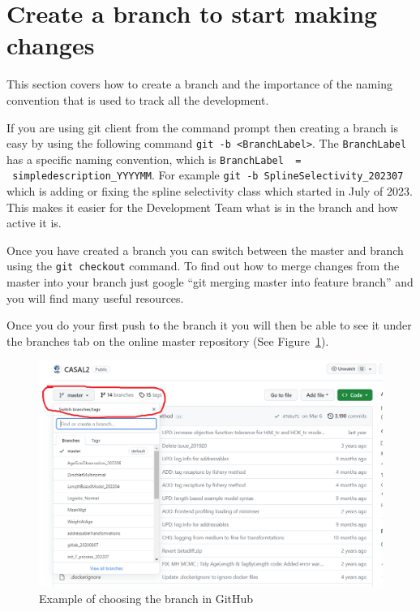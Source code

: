 \section{Create a branch to start making changes\label{sec:maintain_repo}}

This section covers how to create a branch and the importance of the naming convention that is used to track all the development. 

If you are using git client from the command prompt then creating a branch is easy by using the following command \texttt{git -b <BranchLabel>}. The \texttt{BranchLabel} has a specific naming convention, which is  \texttt{BranchLabel \ = \ simpledescription\_YYYYMM}. For example \texttt{git -b SplineSelectivity\_202307} which is adding or fixing the spline selectivity class which started in July of 2023. This makes it easier for the Development Team what is in the branch and how active it is.

Once you have created a branch you can switch between the master and branch using the \texttt{git checkout} command. To find out how to merge changes from the master into your branch just google \enquote{git merging master into feature branch} and you will find many useful resources.

Once you do your first push to the branch it you will then be able to see it under the branches tab on the online master repository (See Figure~\ref{fig:branchtab}).

\begin{figure}[!ht]
	\centering
	\includegraphics[scale=0.6]{Figures/branch_tab.png}
	\caption{Example of choosing the branch in GitHub}\label{fig:branchtab}
\end{figure}